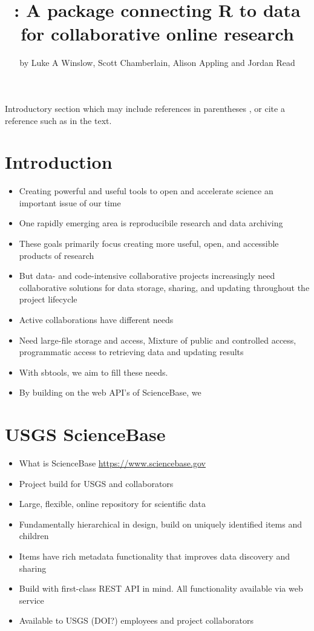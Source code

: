 \title{: A package connecting R to data for collaborative online research}
\author{by Luke A Winslow, Scott Chamberlain, Alison Appling and Jordan Read}

\maketitle


Introductory section which may include references in parentheses
\citep{R}, or cite a reference such as \citet{R} in the text.

\section{Introduction}

\begin{itemize}
	\item{Creating powerful and useful tools to open and accelerate science an important issue of our time}
	\item{One rapidly emerging area is reproducibile research and data archiving}
	\item{These goals primarily focus creating more useful, open, and accessible products of research}
	\item{But data- and code-intensive collaborative projects increasingly need collaborative solutions for data storage, sharing, and updating throughout the project lifecycle}
	\item{Active collaborations have different needs}
	\item{Need large-file storage and access, Mixture of public and controlled access, programmatic access to retrieving data and updating results}
	\item{With sbtools, we aim to fill these needs.}
	\item{By building on the web API's of ScienceBase, we }
	
\end{itemize}


\section{USGS ScienceBase}

\begin{itemize}
	\item{What is ScienceBase \url{https://www.sciencebase.gov}}
	\item{Project build for USGS and collaborators}
	\item{Large, flexible, online repository for scientific data}
	\item{Fundamentally hierarchical in design, build on uniquely identified items and children}
	\item{Items have rich metadata functionality that improves data discovery and sharing}
	\item{Build with first-class REST API in mind. All functionality available via web service}
	\item{Available to USGS (DOI?) employees and project collaborators}
\end{itemize}

